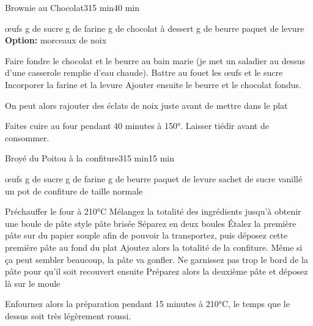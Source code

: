 \begin{recette}{Brownie au Chocolat}{3}{15 min}{40 min}
\begin{ingredients}
 œufs
 g de sucre
 g de farine
 g de chocolat à dessert
 g de beurre
 paquet de levure
\ingredient \textbf{Option: } morceaux de noix
\end{ingredients}

\begin{preparation}
\etape Faire fondre le chocolat et le beurre au bain marie (je met un saladier au dessus d'une casserole remplie d'eau chaude).
\etape Battre au fouet les œufs et le sucre
\etape Incorporer la farine et la levure
\etape Ajouter ensuite le beurre et le chocolat fondus.
\begin{remarque}
On peut alors rajouter des éclats de noix juste avant de mettre dans le plat
\end{remarque}

\end{preparation}

\begin{cuisson}
Faites cuire au four pendant 40 minutes à 150°.
Laisser tiédir avant de consommer. 
\end{cuisson}
\end{recette}

\begin{recette}{Broyé du Poitou à la confiture}{3}{15 min}{15 min}
\begin{ingredients}
 œufs
 g de sucre
 g de farine
 g de beurre
 paquet de levure
 sachet de sucre vanillé
\ingredient un pot de confiture de taille normale
\end{ingredients}

\begin{preparation}
\etape Préchauffer le four à 210°C
\etape Mélangez la totalité des ingrédients jusqu'à obtenir une boule de pâte style pâte brisée
\etape Séparez en deux boules
\etape Étalez la première pâte sur du papier souple afin de pouvoir la transportez, puis déposez cette première pâte au fond du 
plat
\etape Ajoutez alors la totalité de la confiture. Même si ça peut sembler beaucoup, la pâte va gonfler. Ne garnissez pas trop 
le bord de la pâte pour qu'il soit recouvert ensuite
\etape Préparez alors la deuxième pâte et déposez là sur le moule
\end{preparation}

\begin{cuisson}
Enfournez alors la préparation pendant 15 minutes à 210°C, le temps que le dessus soit très légèrement roussi.
\end{cuisson}
\end{recette}

